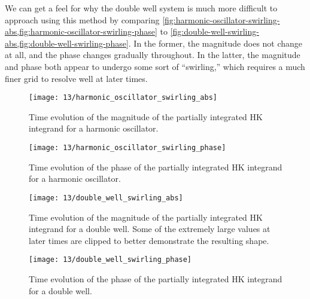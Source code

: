 We can get a feel for why the double well system is much more difficult to approach using this method by comparing \cref{fig:harmonic-oscillator-swirling-abs,fig:harmonic-oscillator-swirling-phase} to \cref{fig:double-well-swirling-abs,fig:double-well-swirling-phase}.
In the former, the magnitude does not change at all, and the phase changes gradually throughout.
In the latter, the magnitude and phase both appear to undergo some sort of ``swirling,'' which requires a much finer grid to resolve well at later times.

\begin{figure}
	\centering
	\texttt{[image: 13/harmonic\_oscillator\_swirling\_abs]}
	\caption[
		Time evolution of integrand for harmonic oscillator
	]{
		Time evolution of the magnitude of the partially integrated HK integrand for a harmonic oscillator.
		\explainsketch{}
		\explainparadiff{}
	}
	\label{fig:harmonic-oscillator-swirling-abs}
\end{figure}

\begin{figure}
	\centering
	\texttt{[image: 13/harmonic\_oscillator\_swirling\_phase]}
	\caption[
		Time evolution of integrand for harmonic oscillator \cont
	]{
		Time evolution of the phase of the partially integrated HK integrand for a harmonic oscillator.
		\explainsketch{}
		\explainparadiff{}
	}
	\label{fig:harmonic-oscillator-swirling-phase}
\end{figure}

\begin{figure}
	\centering
	\texttt{[image: 13/double\_well\_swirling\_abs]}
	\caption[
		Time evolution of integrand for double well
	]{
		Time evolution of the magnitude of the partially integrated HK integrand for a double well.
		\explainsketch{}
		Some of the extremely large values at later times are clipped to better demonstrate the resulting shape.
	}
	\label{fig:double-well-swirling-abs}
\end{figure}

\begin{figure}
	\centering
	\texttt{[image: 13/double\_well\_swirling\_phase]}
	\caption[
		Time evolution of integrand for double well \cont
	]{
		Time evolution of the phase of the partially integrated HK integrand for a double well.
		\explainsketch{}
	}
	\label{fig:double-well-swirling-phase}
\end{figure}
